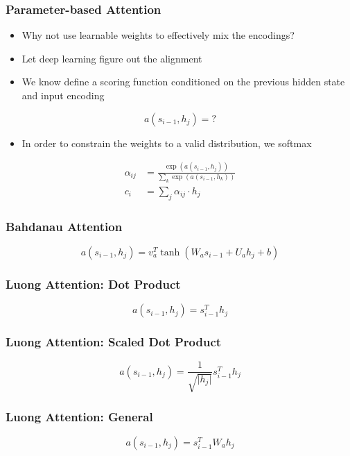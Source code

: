 \documentclass{beamer}
\begin{document}
\begin{frame}
\frametitle{Parameter-based Attention}
\begin{itemize}
  \item Why not use learnable weights to effectively mix the encodings?
  \item Let deep learning figure out the alignment
  \item We know define a scoring function conditioned on the previous hidden state and input encoding
\end{itemize}
\begin{equation*}
  a\left( s_{i-1}, h_j \right) = ?
\end{equation*}
\begin{itemize}
  \item In order to constrain the weights to a valid distribution, we softmax
\end{itemize}
\begin{equation*}
  \begin{split}
    \alpha_{ij} &= \frac{\exp\left( a\left( s_{i-1}, h_j \right) \right)}{\sum_k \exp\left( a\left( s_{i-1}, h_k \right) \right)}\\
    c_i &= \sum_{j} \alpha_{ij} \cdot h_j
  \end{split}
\end{equation*}
\end{frame}

\begin{frame}
\frametitle{Bahdanau Attention}
\begin{equation*}
  a\left( s_{i-1}, h_j \right) = v_a^T \tanh \left( W_a s_{i-1} + U_a h_j + b \right)
\end{equation*}
\end{frame}


\begin{frame}
\frametitle{Luong Attention: Dot Product}
\begin{equation*}
  a\left( s_{i-1}, h_j \right) = s_{i-1}^T h_j
\end{equation*}
\end{frame}

\begin{frame}
\frametitle{Luong Attention: Scaled Dot Product}
\begin{equation*}
  a\left( s_{i-1}, h_j \right) = \frac{1}{\sqrt{\lvert h_j \rvert}} s_{i-1}^T h_j
\end{equation*}
\end{frame}

\begin{frame}
\frametitle{Luong Attention: General}
\begin{equation*}
  a\left( s_{i-1}, h_j \right) = s_{i-1}^T W_a h_j
\end{equation*}
\end{frame}
\end{document}
